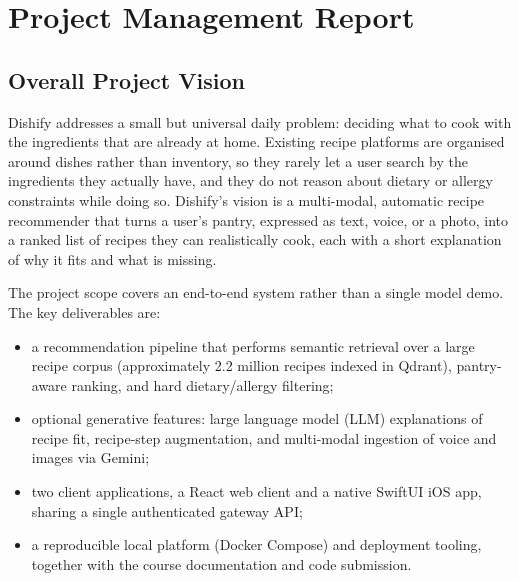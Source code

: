 %
%
\chapter{Project Management Report}
\label{ch:project-management}

\section{Overall Project Vision}

Dishify addresses a small but universal daily problem: deciding what to cook with
the ingredients that are already at home. Existing recipe platforms are organised
around dishes rather than inventory, so they rarely let a user search by the
ingredients they actually have, and they do not reason about dietary or allergy
constraints while doing so. Dishify's vision is a multi-modal, automatic recipe
recommender that turns a user's pantry, expressed as text, voice, or a photo, into
a ranked list of recipes they can realistically cook, each with a short
explanation of why it fits and what is missing.

The project scope covers an end-to-end system rather than a single model demo. The
key deliverables are:

\begin{itemize}
    \item a recommendation pipeline that performs semantic retrieval over a
          large recipe corpus (approximately 2.2 million recipes indexed in
          Qdrant), pantry-aware ranking, and hard dietary/allergy filtering;
    \item optional generative features: large language model (LLM) explanations
          of recipe fit, recipe-step augmentation, and multi-modal ingestion of
          voice and images via Gemini;
    \item two client applications, a React web client and a native SwiftUI iOS
          app, sharing a single authenticated gateway API;
    \item a reproducible local platform (Docker Compose) and deployment
          tooling, together with the course documentation and code submission.
\end{itemize}

